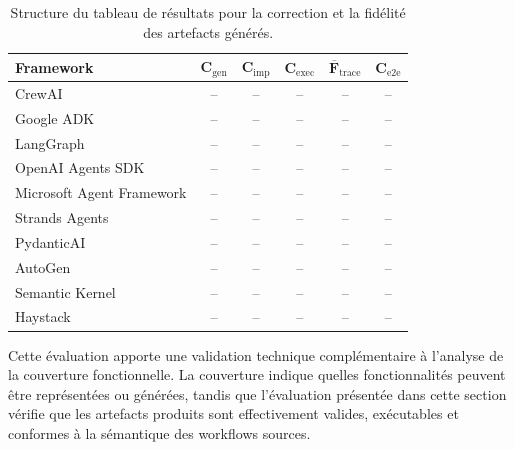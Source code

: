 \begin{table}[t]
    \centering
    \caption{Structure du tableau de résultats pour la correction et
    la fidélité des artefacts générés.}
    \label{tab:resultats-correction}
    \begin{tabularx}{\textwidth}{@{}lccccc@{}}
        \toprule
        \textbf{Framework}
        & $\boldsymbol{C_{\mathrm{gen}}}$
        & $\boldsymbol{C_{\mathrm{imp}}}$
        & $\boldsymbol{C_{\mathrm{exec}}}$
        & $\boldsymbol{\overline{F}_{\mathrm{trace}}}$
        & $\boldsymbol{C_{\mathrm{e2e}}}$ \\
        \midrule
        CrewAI                   & -- & -- & -- & -- & -- \\
        Google ADK               & -- & -- & -- & -- & -- \\
        LangGraph                & -- & -- & -- & -- & -- \\
        OpenAI Agents SDK        & -- & -- & -- & -- & -- \\
        Microsoft Agent Framework & -- & -- & -- & -- & -- \\
        Strands Agents           & -- & -- & -- & -- & -- \\
        PydanticAI               & -- & -- & -- & -- & -- \\
        AutoGen                  & -- & -- & -- & -- & -- \\
        Semantic Kernel          & -- & -- & -- & -- & -- \\
        Haystack                 & -- & -- & -- & -- & -- \\
        \bottomrule
    \end{tabularx}
\end{table}

Cette évaluation apporte une validation technique complémentaire à
l'analyse de la couverture fonctionnelle. La couverture indique quelles
fonctionnalités peuvent être représentées ou générées, tandis que
l'évaluation présentée dans cette section vérifie que les artefacts
produits sont effectivement valides, exécutables et conformes à la
sémantique des workflows sources.